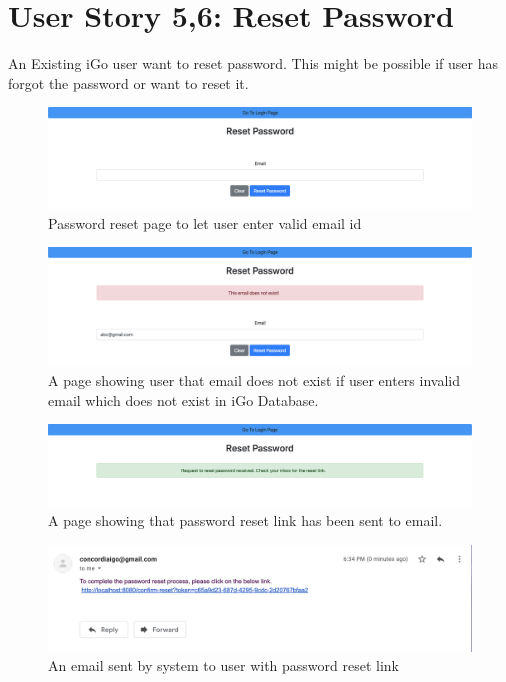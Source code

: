 \documentclass[11pt, english]{report}
\begin{document}
\section{User Story 5,6: Reset Password}

An Existing iGo user want to reset password. This might be possible if user has forgot the password or want to reset it.

\begin{figure}[H]
  \includegraphics[width=1\textwidth]{images/reset_password_page.png}
  \centering
  \caption{Password reset page to let user enter valid email id}
\end{figure}

\begin{figure}[H]
  \includegraphics[width=1\textwidth]{images/invalid_email_forgot_password.png}
  \centering
  \caption{A page showing user that email does not exist if user enters invalid email which does not exist in iGo Database.}
\end{figure}


\begin{figure}[H]
  \includegraphics[width=1\textwidth]{images/reset_password_sent_message.png}
  \centering
  \caption{A page showing that password reset link has been sent to email.}
\end{figure}

\begin{figure}[H]
  \includegraphics[width=1\textwidth]{images/reset_password_email.png}
  \centering
  \caption{An email sent by system to user with password reset link}
\end{figure}
\end{document}

